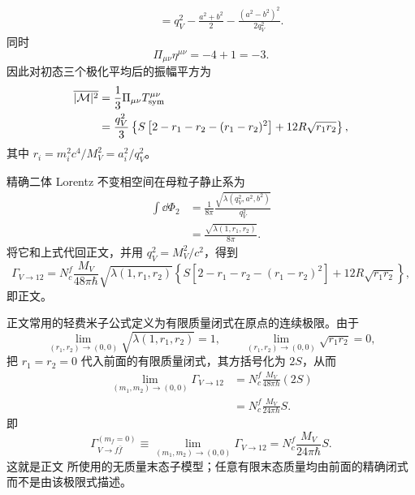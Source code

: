 \begin{derivation}[有质量费米子末态的矢量衰变宽度]
\begin{align*}
 &\quad=q_V^2-\frac{a^2+b^2}{2}
 -\frac{(a^2-b^2)^2}{2q_V^2}.
\end{align*}
同时
\begin{equation*}
 \Pi_{\mu\nu}\eta^{\mu\nu}=-4+1=-3.
\end{equation*}
因此对初态三个极化平均后的振幅平方为
\begin{align*}
 \overline{|\mathcal M|^2}
 &=\frac13\Pi_{\mu\nu}T_{\rm sym}^{\mu\nu}\\
 &=\frac{q_V^2}{3}
 \left\{
 S\left[2-r_1-r_2-(r_1-r_2)^2\right]
 +12R\sqrt{r_1r_2}
 \right\},
\end{align*}
其中 $r_i=m_i^2c^4/M_V^2=a_i^2/q_V^2$。

精确二体 Lorentz 不变相空间在母粒子静止系为
\begin{align*}
 \int\dd\Phi_2
 &=\frac{1}{8\pi}
 \frac{\sqrt{\lambda(q_V^2,a^2,b^2)}}{q_V^2}\\
 &=\frac{\sqrt{\lambda(1,r_1,r_2)}}{8\pi}.
\end{align*}
将它和上式代回正文，并用
$q_V^2=M_V^2/c^2$，得到
\begin{equation*}
 \Gamma_{V\to12}
 =N_c^f\frac{M_V}{48\pi\hbar}\sqrt{\lambda(1,r_1,r_2)}
 \left\{
 S\left[2-r_1-r_2-(r_1-r_2)^2\right]
 +12R\sqrt{r_1r_2}
 \right\},
\end{equation*}
即正文。

正文常用的轻费米子公式定义为有限质量闭式在原点的连续极限。由于
\begin{equation*}
 \lim_{(r_1,r_2)\to(0,0)}\sqrt{\lambda(1,r_1,r_2)}=1,
 \qquad
 \lim_{(r_1,r_2)\to(0,0)}\sqrt{r_1r_2}=0,
\end{equation*}
把 $r_1=r_2=0$ 代入前面的有限质量闭式，其方括号化为 $2S$，从而
\begin{align*}
\lim_{(m_1,m_2)\to(0,0)}\Gamma_{V\to12}
&=N_c^f\frac{M_V}{48\pi\hbar}(2S)\\
&=N_c^f\frac{M_V}{24\pi\hbar}S.
\end{align*}
即
\begin{equation*}
 {
 \Gamma_{V\to f\bar f}^{(m_f=0)}
 \equiv
 \lim_{(m_1,m_2)\to(0,0)}\Gamma_{V\to12}
 =N_c^f\frac{M_V}{24\pi\hbar}S.}
\end{equation*}
这就是正文 所使用的无质量末态子模型；任意有限末态质量均由前面的精确闭式而不是由该极限式描述。


\end{derivation}
